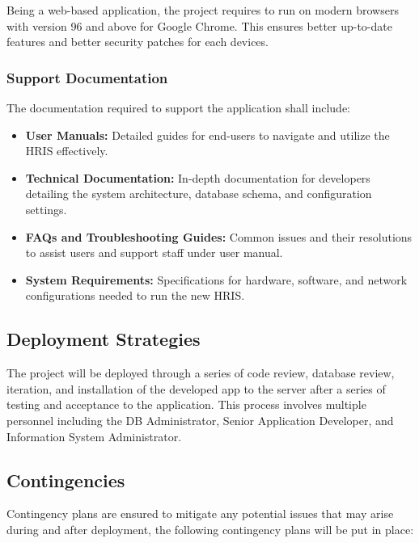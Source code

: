         Being a web-based application, the project requires to run on modern browsers with version 96 and above for Google Chrome. This ensures better up-to-date features and better security patches for each devices.

        \subsubsection{Support Documentation}

        The documentation required to support the application shall include:

        \begin{itemize}
            \item[] \textbf{User Manuals:} Detailed guides for end-users to navigate and utilize the HRIS effectively.
            \item[] \textbf{Technical Documentation:} In-depth documentation for developers detailing the system architecture, database schema, and configuration settings.
            \item[] \textbf{FAQs and Troubleshooting Guides:} Common issues and their resolutions to assist users and support staff under user manual.
            \item[] \textbf{System Requirements:} Specifications for hardware, software, and network configurations needed to run the new HRIS.
        \end{itemize}

    \subsection{Deployment Strategies}
    
    The project will be deployed through a series of code review, database review, iteration, and installation of the developed app to the server after a series of testing and acceptance to the application. This process involves multiple personnel including the DB Administrator, Senior Application Developer, and Information System Administrator. 
    
    \subsection{Contingencies}
    
    Contingency plans are ensured to mitigate any potential issues that may arise during and after deployment, the following contingency plans will be put in place:

